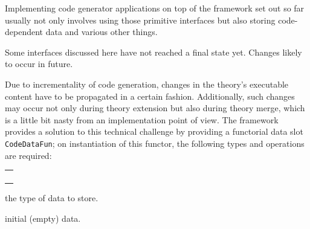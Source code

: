\begin{isabellebody}
\begin{isamarkuptext}
\begin{description}
  \end{description}%
\end{isamarkuptext}%
\isamarkuptrue%
%
\endisatagmlref
{\isafoldmlref}%
%
\isadelimmlref
%
\endisadelimmlref
%
\isamarkuptrue%
%
\begin{isamarkuptext}%
Implementing code generator applications on top
  of the framework set out so far usually not only
  involves using those primitive interfaces
  but also storing code-dependent data and various
  other things.

  \begin{warn}
    Some interfaces discussed here have not reached
    a final state yet.
    Changes likely to occur in future.
  \end{warn}%
\end{isamarkuptext}%
\isamarkuptrue%
%
\isamarkuptrue%
%
\begin{isamarkuptext}%
Due to incrementality of code generation, changes in the
  theory's executable content have to be propagated in a
  certain fashion.  Additionally, such changes may occur
  not only during theory extension but also during theory
  merge, which is a little bit nasty from an implementation
  point of view.  The framework provides a solution
  to this technical challenge by providing a functorial
  data slot \verb|CodeDataFun|; on instantiation
  of this functor, the following types and operations
  are required:

  \medskip
  \begin{tabular}{l}
  \isa{type\ T} \\
  \isa{val\ empty{\isacharcolon}\ T} \\
  \isa{val\ merge{\isacharcolon}\ Pretty{\isachardot}pp\ {\isasymrightarrow}\ T\ {\isacharasterisk}\ T\ {\isasymrightarrow}\ T} \\
  \isa{val\ purge{\isacharcolon}\ theory\ option\ {\isasymrightarrow}\ CodeUnit{\isachardot}const\ list\ option\ {\isasymrightarrow}\ T\ {\isasymrightarrow}\ T}
  \end{tabular}

  \begin{description}

  \item {} the type of data to store.

  \item {} initial (empty) data.


\end{description}
\end{isamarkuptext}
\end{isabellebody}
